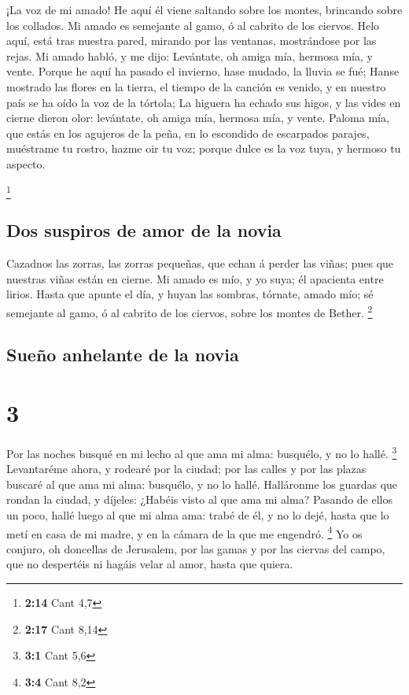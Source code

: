  ¡La voz de mi amado! He aquí él viene saltando sobre los
montes, brincando sobre los collados.  Mi amado es semejante
al gamo, ó al cabrito de los ciervos. Helo aquí, está tras nuestra
pared, mirando por las ventanas, mostrándose por las rejas.
 Mi amado habló, y me dijo: Levántate, oh amiga mía,
hermosa mía, y vente.  Porque he aquí ha pasado el
invierno, hase mudado, la lluvia se fué;  Hanse mostrado
las flores en la tierra, el tiempo de la canción es venido, y en nuestro
país se ha oído la voz de la tórtola;  La higuera ha echado
sus higos, y las vides en cierne dieron olor: levántate, oh amiga mía,
hermosa mía, y vente.  Paloma mía, que estás en los
agujeros de la peña, en lo escondido de escarpados parajes, muéstrame tu
rostro, hazme oir tu voz; porque dulce es la voz tuya, y hermoso tu
aspecto.

\footnote{\textbf{2:14} Cant 4,7}

\hypertarget{dos-suspiros-de-amor-de-la-novia}{%
\subsection{Dos suspiros de amor de la
novia}\label{dos-suspiros-de-amor-de-la-novia}}

 Cazadnos las zorras, las zorras pequeñas, que echan á
perder las viñas; pues que nuestras viñas están en cierne. 
Mi amado es mío, y yo suya; él apacienta entre lirios. 
Hasta que apunte el día, y huyan las sombras, tórnate, amado mío; sé
semejante al gamo, ó al cabrito de los ciervos, sobre los montes de
Bether. \footnote{\textbf{2:17} Cant 8,14}

\hypertarget{sueuxf1o-anhelante-de-la-novia}{%
\subsection{Sueño anhelante de la
novia}\label{sueuxf1o-anhelante-de-la-novia}}

\hypertarget{section-2}{%
\section{3}\label{section-2}}

 Por las noches busqué en mi lecho al que ama mi alma:
busquélo, y no lo hallé. \footnote{\textbf{3:1} Cant 5,6} 
Levantaréme ahora, y rodearé por la ciudad; por las calles y por las
plazas buscaré al que ama mi alma: busquélo, y no lo hallé. 
Halláronme los guardas que rondan la ciudad, y díjeles: ¿Habéis visto al
que ama mi alma?  Pasando de ellos un poco, hallé luego al
que mi alma ama: trabé de él, y no lo dejé, hasta que lo metí en casa de
mi madre, y en la cámara de la que me engendró. \footnote{\textbf{3:4}
  Cant 8,2}  Yo os conjuro, oh doncellas de Jerusalem, por
las gamas y por las ciervas del campo, que no despertéis ni hagáis velar
al amor, hasta que quiera.

